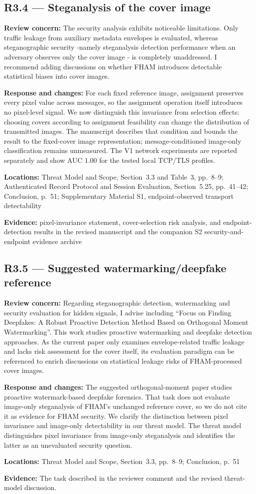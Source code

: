 \documentclass[12pt,a4paper]{article}
\newcommand{\revcomment}[1]{\par\medskip\noindent\textbf{Review concern:} #1\par\smallskip}
\newcommand{\responsechanges}[1]{\par\noindent\textbf{Response and changes:} #1\par}
\newcommand{\locations}[1]{\par\noindent\textbf{Locations:} #1\par}
\newcommand{\evidence}[1]{\par\noindent\textbf{Evidence:} #1\par\smallskip}
\begin{document}
\subsection*{R3.4 --- Steganalysis of the cover image}

\revcomment{The security analysis exhibits noticeable limitations. Only traffic leakage from auxiliary metadata envelopes is evaluated, whereas steganographic security -namely steganalysis detection performance when an adversary observes only the cover image - is completely unaddressed. I recommend adding discussions on whether FHAM introduces detectable statistical biases into cover images.}
\responsechanges{For each fixed reference image, assignment preserves every pixel value across messages, so the assignment operation itself introduces no pixel-level signal. We now distinguish this invariance from selection effects: choosing covers according to assignment feasibility can change the distribution of transmitted images. The manuscript describes that condition and bounds the result to the fixed-cover image representation; message-conditioned image-only classification remains unmeasured. The V1 network experiments are reported separately and show AUC 1.00 for the tested local TCP/TLS profiles.}
\locations{Threat Model and Scope, Section~3.3 and Table~3, pp.~8--9; Authenticated Record Protocol and Session Evaluation, Section~5.25, pp.~41--42; Conclusion, p.~51; Supplementary Material S1, endpoint-observed transport detectability}
\evidence{pixel-invariance statement, cover-selection risk analysis, and endpoint-detection results in the revised manuscript and the companion S2 security-and-endpoint evidence archive}

\subsection*{R3.5 --- Suggested watermarking/deepfake reference}

\revcomment{Regarding steganographic detection, watermarking and security evaluation for hidden signals, I advise including ``Focus on Finding Deepfakes: A Robust Proactive Detection Method Based on Orthogonal Moment Watermarking''. This work studies proactive watermarking and deepfake detection approaches. As the current paper only examines envelope-related traffic leakage and lacks risk assessment for the cover itself, its evaluation paradigm can be referenced to enrich discussions on statistical leakage risks of FHAM-processed cover images.}
\responsechanges{The suggested orthogonal-moment paper studies proactive watermark-based deepfake forensics. That task does not evaluate image-only steganalysis of FHAM's unchanged reference cover, so we do not cite it as evidence for FHAM security. We clarify the distinction between pixel invariance and image-only detectability in our threat model. The threat model distinguishes pixel invariance from image-only steganalysis and identifies the latter as an unevaluated security question.}
\locations{Threat Model and Scope, Section~3.3, pp.~8--9; Conclusion, p.~51}
\evidence{The task described in the reviewer comment and the revised threat-model discussion.}
\end{document}
